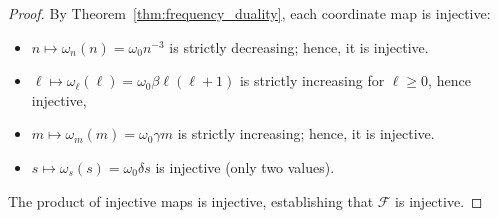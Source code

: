 \documentclass[twocolumn,10pt,a4paper]{article}
\theoremstyle{remark}
\begin{document}
\begin{proof}
By Theorem~\ref{thm:frequency_duality}, each coordinate map is injective:
\begin{itemize}[noitemsep]
    \item $n \mapsto \omega_n(n) = \omega_0 n^{-3}$ is strictly decreasing; hence, it is injective.
    \item $\ell \mapsto \omega_\ell(\ell) = \omega_0 \beta \ell(\ell+1)$ is strictly increasing for $\ell \geq 0$, hence injective,
    \item $m \mapsto \omega_m(m) = \omega_0 \gamma m$ is strictly increasing; hence, it is injective.
    \item $s \mapsto \omega_s(s) = \omega_0 \delta s$ is injective (only two values).
\end{itemize}
The product of injective maps is injective, establishing that $\mathcal{F}$ is injective.
\end{proof}
\end{document}
